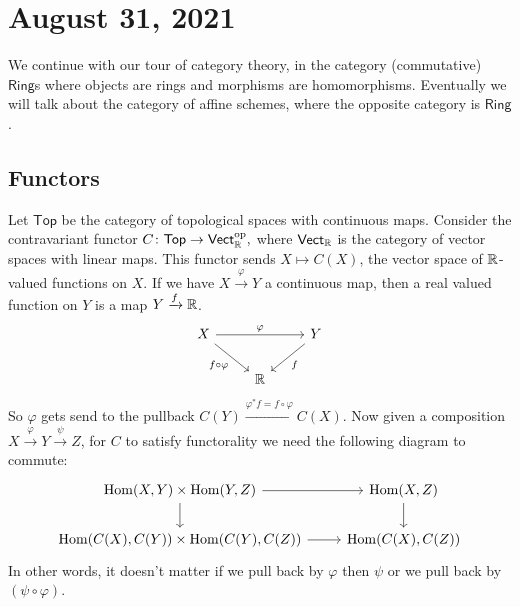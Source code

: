 \section{August 31, 2021} 
We continue with our tour of category theory, in the category (commutative) $\mathsf{Ring} $s where objects are rings and morphisms are homomorphisms. Eventually we will talk about the category of affine schemes, where the opposite category is $\mathsf{Ring} $.

\subsection{Functors}
Let $\mathsf{Top} $ be the category of topological spaces with continuous maps. Consider the contravariant functor $C \colon \mathsf{Top} \to \mathsf{Vect} _{\mathbb{R}}^{\mathrm{op}},$ where $\mathsf{Vect} _{\mathbb{R}}$ is the category of vector spaces with linear maps. This functor sends $X \mapsto C(X)$, the vector space of $\mathbb{R}$-valued functions on $X$. If we have $X \xrightarrow{\varphi } Y$ a continuous map, then a real valued function on $Y$ is a map $Y \xrightarrow{f} \mathbb{R}$. \[
\begin{tikzcd}
X \arrow[rr, "\varphi "] \arrow[rd, "f \circ \varphi "'] &   & Y \arrow[ld, "f"] \\
                                          & \R &                  
\end{tikzcd}
\] So $\varphi $ gets send to the pullback $C(Y) \xrightarrow{\varphi ^* f= f \circ \varphi }   C(X)$. Now given a composition $X \xrightarrow{\varphi } Y \xrightarrow{\psi} Z$, for $C$ to satisfy functorality we need the following diagram to commute:
\[
\begin{tikzcd}
{\Hom(X , Y)\times \Hom(Y,Z)} \arrow[r] \arrow[d] & {\Hom(X,Z)} \arrow[d] \\
{\Hom(C(X) , C(Y))\times \Hom(C(Y),C(Z))} \arrow[r]            & {\Hom(C(X),C(Z))}         
\end{tikzcd}
\] 
In other words, it doesn't matter if we pull back by $\varphi $ then $\psi$ or we pull back by $(\psi \circ \varphi )$.

